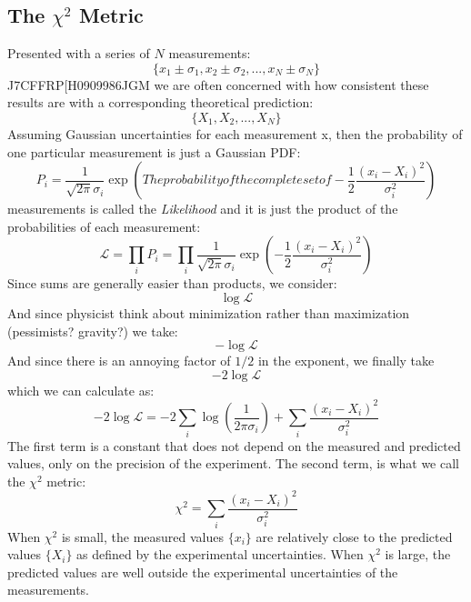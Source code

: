 \documentclass[12pt]{article}
\begin{document}
\subsection{The $\chi^2$ Metric}
Presented with a series of $N$ measurements:
\begin{displaymath}
\{x_1 \pm \sigma_1, x_2 \pm \sigma_2, ..., x_N \pm \sigma_N\}
\end{displaymath}J7CFFRP[H0909986JGM      
we are often concerned with how consistent these results are with a corresponding theoretical prediction:
\begin{displaymath}
\{X_1, X_2, ..., X_N\}
\end{displaymath}
Assuming Gaussian uncertainties for each measurement x, then the probability of one particular measurement is just a Gaussian PDF:
\begin{displaymath}
P_i = \frac{1}{\sqrt{2\pi} \sigma_i} \exp\left(
The probability of the complete set of -\frac{1}{2} \frac{(x_i-X_i)^2}{\sigma_i^2}\right)
\end{displaymath}measurements is called the {\em Likelihood} and it is just the product of the probabilities of each measurement:
\begin{displaymath}
\mathcal{L} = \prod_i P_i = \prod_i \frac{1}{\sqrt{2\pi} \sigma_i} \exp\left(-\frac{1}{2} \frac{(x_i-X_i)^2}{\sigma_i^2}\right)
\end{displaymath}
Since sums are generally easier than products, we consider:
\begin{displaymath}
\log \mathcal{L}
\end{displaymath}
And since physicist think about minimization rather than maximization (pessimists?  gravity?) we take:
\begin{displaymath}
-\log \mathcal{L}
\end{displaymath}
And since there is an annoying factor of $1/2$ in the exponent, we finally take
\begin{displaymath}
-2 \log \mathcal{L}
\end{displaymath}
which we can calculate as:
\begin{displaymath}
-2 \log \mathcal{L} = -2 \sum_i \log\left( \frac{1}{2 \pi \sigma_i }\right) + \sum_i \frac{(x_i-X_i)^2}{\sigma_i^2}
\end{displaymath}
The first term is a constant that does not depend on the measured and predicted values, only on the precision of the experiment.  The second term, is what we call the $\chi^2$ metric:
\begin{equation}
\chi^2 = \sum_i \frac{(x_i-X_i)^2}{\sigma_i^2}
\end{equation}
When $\chi^2$ is small, the measured values $\{x_i\}$ are relatively close to the predicted values $\{X_i\}$ as defined by the experimental uncertainties.  When $\chi^2$ is large, the predicted values are well outside the experimental uncertainties of the measurements.
\end{document}
